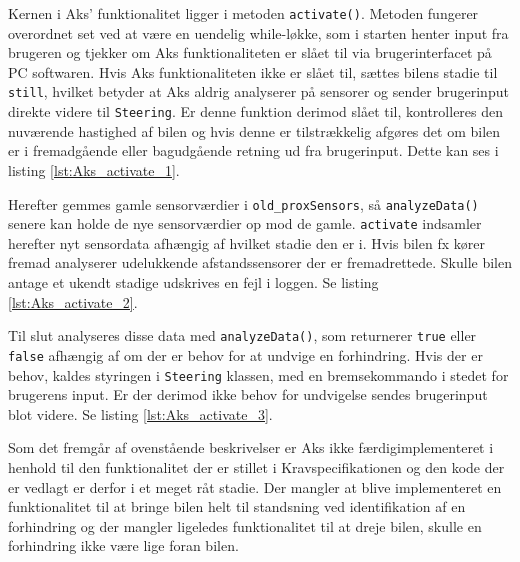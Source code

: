 

Kernen i Aks' funktionalitet ligger i metoden \texttt{activate()}.
Metoden fungerer overordnet set ved at være en uendelig while-løkke, som i starten henter input fra brugeren og tjekker om Aks funktionaliteten er slået til via brugerinterfacet på PC softwaren.
Hvis Aks funktionaliteten ikke er slået til, sættes bilens stadie til \texttt{still}, hvilket betyder at Aks aldrig analyserer på sensorer og sender brugerinput direkte videre til \texttt{Steering}.
Er denne funktion derimod slået til, kontrolleres den nuværende hastighed af bilen og hvis denne er tilstrækkelig afgøres det om bilen er i fremadgående eller bagudgående retning ud fra brugerinput.
Dette kan ses i listing \ref{lst:Aks_activate_1}.



Herefter gemmes gamle sensorværdier i \texttt{old\_proxSensors}, så \texttt{analyzeData()} senere kan holde de nye sensorværdier op mod de gamle.
\texttt{activate} indsamler herefter nyt sensordata afhængig af hvilket stadie den er i.
Hvis bilen fx kører fremad analyserer udelukkende afstandssensorer der er fremadrettede.
Skulle bilen antage et ukendt stadige udskrives en fejl i loggen.
Se listing \ref{lst:Aks_activate_2}.



Til slut analyseres disse data med \texttt{analyzeData()}, som returnerer \texttt{true} eller \texttt{false} afhængig af om der er behov for at undvige en forhindring.
Hvis der er behov, kaldes styringen i \texttt{Steering} klassen, med en bremsekommando i stedet for brugerens input.
Er der derimod ikke behov for undvigelse sendes brugerinput blot videre. Se listing \ref{lst:Aks_activate_3}.



Som det fremgår af ovenstående beskrivelser er Aks ikke færdigimplementeret i henhold til den funktionalitet der er stillet i Kravspecifikationen og den kode der er vedlagt er derfor i et meget råt stadie.
Der mangler at blive implementeret en funktionalitet til at bringe bilen helt til standsning ved identifikation af en forhindring og der mangler ligeledes funktionalitet til at dreje bilen, skulle en forhindring ikke være lige foran bilen.